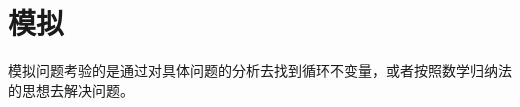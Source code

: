 \documentclass[../../main.tex]{subfiles}
\begin{document}
\setchapterpreamble[u]{\margintoc}

\chapter{模拟}

模拟问题考验的是通过对具体问题的分析去找到循环不变量，或者按照数学归纳法的思想去解决问题。
\end{document}

